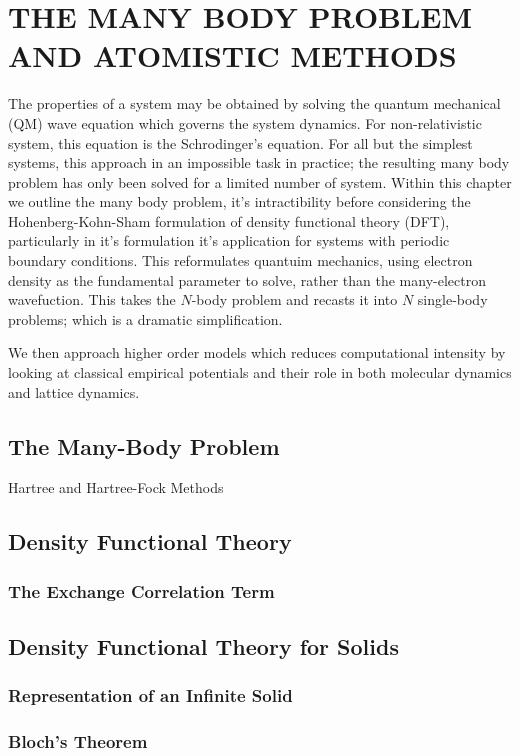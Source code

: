 \chapter{THE MANY BODY PROBLEM AND ATOMISTIC METHODS}

The properties of a system may be obtained by solving the quantum mechanical (QM) wave equation which governs the system dynamics.  For non-relativistic system, this equation is the Schrodinger's equation.  For all but the simplest systems, this approach in an impossible task in practice; the resulting many body problem has only been solved for a limited number of system.  Within this chapter we outline the many body problem, it's intractibility before considering the Hohenberg-Kohn-Sham formulation of density functional theory (DFT), particularly in it's formulation it's application for systems with periodic boundary conditions.  This reformulates quantuim mechanics, using electron density as the fundamental parameter to solve, rather than the many-electron wavefuction.  This takes the $N$-body problem and recasts it into $N$ single-body problems; which is a dramatic simplification.

We then approach higher order models which reduces computational intensity by looking at classical empirical potentials and their role in both molecular dynamics and lattice dynamics.

\section{The Many-Body Problem}
Hartree and Hartree-Fock Methods
\section{Density Functional Theory}
\subsection{The Exchange Correlation Term}
\section{Density Functional Theory for Solids}
\subsection{Representation of an Infinite Solid}
\subsection{Bloch's Theorem}

